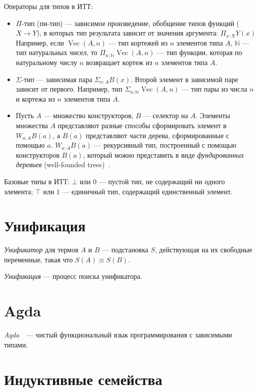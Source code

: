 Операторы для типов в ИТТ:
\begin{itemize}
    \item $\Pi$-тип (пи-тип) — зависимое произведение, обобщение типов функций ($ X \to Y $),
        в которых тип результата зависит от значения аргумента:
        $\Pi_{x : X} Y(x)$
        Например, если $\operatorname{Vec}(A, n)$ — тип кортежей из $n$ элементов типа $A$,
        $\mathbb N$ — тип натуральных чисел, то
        $\Pi_{n \mathbin{:} {\mathbb N}} \operatorname{Vec}(A, n)$ 
        — тип функции, которая по натуральному числу $n$ возвращает кортеж из
        $n$ элементов типа $A$.
    \item $\Sigma$-тип — зависимая пара $\Sigma_{x : A} B(x)$.
        Второй элемент в зависимой паре зависит от первого.
        Например, тип $\Sigma_{n \mathbin{:} {\mathbb N}} \operatorname{Vec}(A, n)$ — тип 
        пары из числа $n$ и кортежа из $n$ элементов типа $A$.
    \item Пусть $A$ — множество конструкторов, $B$ — селектор на $A$.
        Элементы множества $A$ представляют разные способы сформировать
элемент в $W_{a : A} B(a) $, а $B(a)$ представляют части дерева, сформированные с помощью $a$.
        $W_{a : A} B(a) $  — рекурсивный тип, построенный с помощью конструкторов $B(a)$,
        который можно представить в виде \emph{фундированных деревьев} (well-founded trees)~\cite{WTypes}.
\end{itemize}
Базовые типы в ИТТ:
$\bot$ или $0$ — пустой тип, не содержащий ни одного элемента;
$\top$ или $1$ — единичный тип, содержащий единственный элемент.

\section{Унификация}

\emph{Унификатор} для термов $A$ и $B$ — подстановка $S$, действующая на их
свободные переменные, такая что $S(A) \equiv S(B)$.

\emph{Унификация} — процесс поиска унификатора.

\section{Agda}
\emph{Agda}~\cite{AgdaLang}~—  чистый функциональный язык программирования с зависимыми типами.


\section{Индуктивные семейства}

